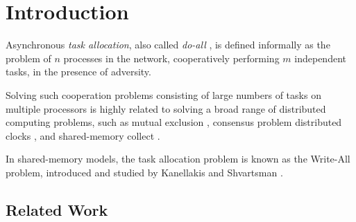 \chapter{Introduction}
%
%


Asynchronous \emph{task allocation}, also called \emph{do-all} \cite{georgiou2007all}, is defined informally
as the problem of $n$ processes in the
network, cooperatively performing $m$ independent tasks, in the presence of adversity.

Solving such cooperation problems consisting of large numbers
of tasks on multiple processors is highly related to solving a broad range of distributed computing problems,
such as mutual exclusion \cite{bender2011mutual}, consensus problem \cite{lynch1996distributed}
distributed clocks \cite{aumann1992clock},
and shared-memory collect \cite{ajtai1994theory}.

In shared-memory models, the task allocation problem is known as the Write-All problem,
introduced and studied by Kanellakis and Shvartsman \cite{kanellakis1992efficient}.

\section{Related Work}

